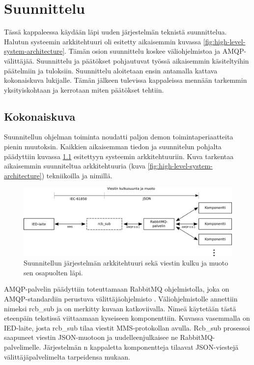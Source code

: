\chapter{Suunnittelu}
\label{ch:suunnittelu}
Tässä kappaleessa käydään läpi uuden järjestelmän teknistä suunnittelua. Halutun systeemin arkkitehtuuri oli esitetty aikaisemmin kuvassa \ref{fig:high-level-system-architecture}. Tämän osion suunnittelu koskee väliohjelmistoa ja AMQP-välittäjää. Suunnittelu ja päätökset pohjautuvat työssä aikaisemmin käsiteltyihin päätelmiin ja tuloksiin. Suunnittelu aloitetaan ensin antamalla kattava kokonaiskuva lukijalle. Tämän jälkeen tulevissa kappaleissa mennään tarkemmin yksityiskohtaan ja kerrotaan miten päätökset tehtiin.



\section{Kokonaiskuva}
Suunnitellun ohjelman toiminta noudatti paljon demon toimintaperiaatteita pienin muutoksin. Kaikkien aikaisemman tiedon ja suunnitelun pohjalta päädyttiin kuvassa \ref{fig:planned-system-architecture} esitettyyn systeemin arkkitehtuuriin. Kuva tarkentaa aikaisemmin suunniteltua arkkitehtuuria (kuva \ref{fig:high-level-system-architecture}) tekniikoilla ja nimillä.

\begin{figure}[ht!]
	\includegraphics[width=1\textwidth]{pictures/planned-system-architecture.png}
	\caption{Suunnitellun järjestelmän arkkitehtuuri sekä viestin kulku ja muoto sen osapuolten läpi.}
	\label{fig:planned-system-architecture}
\end{figure}

AMQP-palvelin päädyttiin toteuttamaan RabbitMQ ohjelmistolla, joka on AMQP-stan\-dar\-diin perustuva välittäjäohjelmisto \cite{rabbitmq-homepage}. Väliohjelmistolle annettiin nimeksi rcb\_sub ja on merkitty kuvaan katkoviivalla. Nimeä käytetään tästä eteenpäin tekstissä viittaamaan kyseiseen komponenttiin. Kuvassa vasemmalla on IED-laite, josta rcb\_sub tilaa viestit MMS-protokollan avulla. Rcb\_sub prosessoi saapuneet viestin JSON-muotoon ja uudelleenjulkaisee ne RabbitMQ-palvelimelle. Järjestelmän n kappaletta komponentteja tilaavat JSON-viestejä välittäjäpalvelimelta tarpeidensa mukaan.

